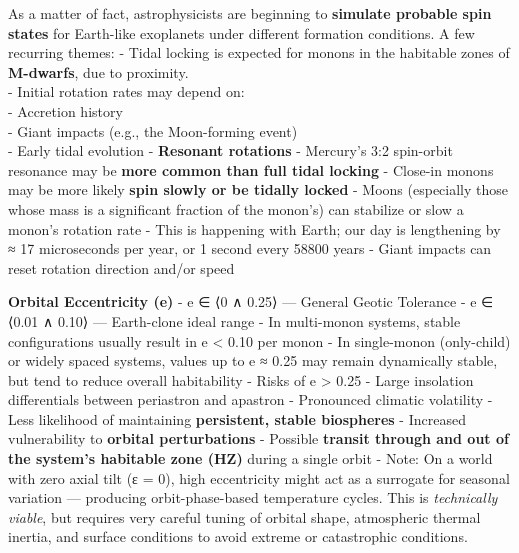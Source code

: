 \documentclass[
  letterpaper,
]{book}
\begin{document}
As a matter of fact, astrophysicists are beginning to \textbf{simulate
probable spin states} for Earth-like exoplanets under different
formation conditions. A few recurring themes: - Tidal locking is
expected for monons in the habitable zones of \textbf{M-dwarfs}, due to
proximity.\\
- Initial rotation rates may depend on:\\
- Accretion history\\
- Giant impacts (e.g., the Moon-forming event)\\
- Early tidal evolution - \textbf{Resonant rotations} - Mercury's 3:2
spin-orbit resonance may be \textbf{more common than full tidal locking}
- Close-in monons may be more likely \textbf{spin slowly or be tidally
locked} - Moons (especially those whose mass is a significant fraction
of the monon's) can stabilize or slow a monon's rotation rate - This is
happening with Earth; our day is lengthening by ≈ 17 microseconds per
year, or 1 second every 58800 years - Giant impacts can reset rotation
direction and/or speed

\textbf{Orbital Eccentricity (e)} - e ∈ ⟨0 ∧ 0.25⟩ --- General Geotic
Tolerance - e ∈ ⟨0.01 ∧ 0.10⟩ --- Earth-clone ideal range - In
multi-monon systems, stable configurations usually result in e
\textless{} 0.10 per monon - In single-monon (only-child) or widely
spaced systems, values up to e ≈ 0.25 may remain dynamically stable, but
tend to reduce overall habitability - Risks of e \textgreater{} 0.25 -
Large insolation differentials between periastron and apastron -
Pronounced climatic volatility - Less likelihood of maintaining
\textbf{persistent, stable biospheres} - Increased vulnerability to
\textbf{orbital perturbations} - Possible \textbf{transit through and
out of the system's habitable zone (HZ)} during a single orbit - Note:
On a world with zero axial tilt (ε = 0), high eccentricity might act as
a surrogate for seasonal variation --- producing orbit-phase-based
temperature cycles. This is \emph{technically viable}, but requires very
careful tuning of orbital shape, atmospheric thermal inertia, and
surface conditions to avoid extreme or catastrophic conditions.
\end{document}
